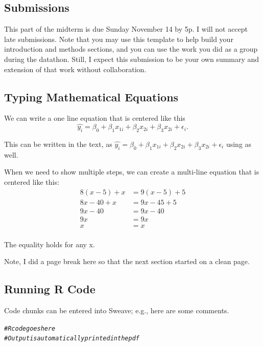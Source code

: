 \documentclass{article}\usepackage[]{graphicx}\usepackage[]{xcolor}
\makeatletter
\newcommand{\hlcom}[1]{\textcolor[rgb]{0.678,0.584,0.686}{\textit{#1}}}%
\newenvironment{kframe}{%
 \def\at@end@of@kframe{}%
 \ifinner\ifhmode%
  \def\at@end@of@kframe{\end{minipage}}%
  \begin{minipage}{\columnwidth}%
 \fi\fi%
 \def\FrameCommand##1{\hskip\@totalleftmargin \hskip-\fboxsep
 \colorbox{shadecolor}{##1}\hskip-\fboxsep
     \hskip-\linewidth \hskip-\@totalleftmargin \hskip\columnwidth}%
 \MakeFramed {\advance\hsize-\width
   \@totalleftmargin\z@ \linewidth\hsize
   \@setminipage}}%
 {\par\unskip\endMakeFramed%
 \at@end@of@kframe}
\newenvironment{knitrout}{}{} %
\makeatother
\begin{document}
\begin{multicols}{2}
\subsection{Submissions}
\noindent This part of the midterm is due Sunday November 14 by 5p. I will not accept late submissions. Note that you may use this template to help build your introduction and methods sections, and you can use the work you did as a group during the datathon. Still, I expect this submission to be your own summary and extension of that work without collaboration.

\subsection{Typing Mathematical Equations}
\noindent We can write a one line equation that is centered like this
\[\widehat{y_i} = \beta_0 + \beta_1 x_{1i}+ \beta_2 x_{2i} + \beta_3 x_{2i} + \epsilon_i.\]

\noindent This can be written in the text, as $\widehat{y_i} = \beta_0 + \beta_1 x_{1i}+ \beta_2 x_{2i} + \beta_3 x_{2i} + \epsilon_i$ using as well.

When we need to show multiple steps, we can create a multi-line equation that is centered like this:
\begin{align*}
8(x-5)+x&=9(x-5)+5\\
8x-40+x&=9x-45+5 \tag{Distributing} \\
9x-40&=9x-40 \tag{Combining like terms} \\
9x&=9x \tag{Adding 40 to both sides} \\
x&=x \tag{Dividing both sides by 9} \\
\end{align*}

\noindent The equality holds for any x.

Note, I did a page break here so that the next section
started on a clean page.

\pagebreak

\subsection{Running R Code}

\noindent Code chunks can be entered into Sweave; e.g., here are some comments.
\begin{knitrout}\scriptsize
{}\color{fgcolor}\begin{kframe}
\begin{alltt}
\hlcom{# R code goes here}
\hlcom{# Output is automatically printed in the pdf}
\end{alltt}
\end{kframe}
\end{knitrout}


\end{multicols}
\end{document}
